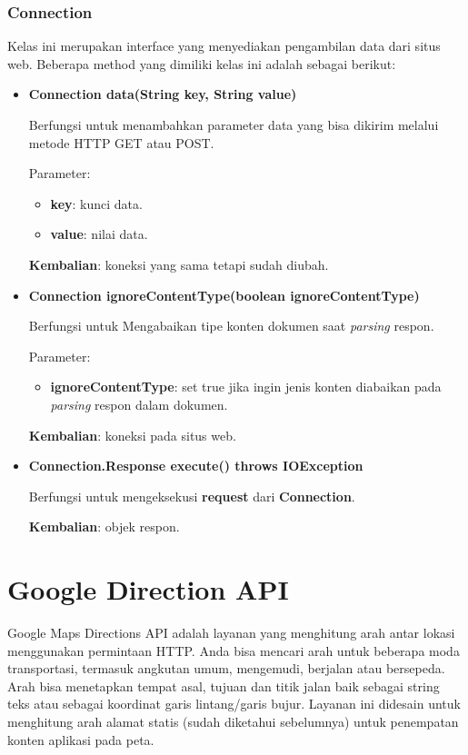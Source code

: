 \subsubsection{Connection}
\label{subsubsec:connection}

Kelas ini merupakan interface yang menyediakan pengambilan data dari situs web. Beberapa method yang dimiliki kelas ini adalah sebagai berikut:
\begin{itemize}
	\item \textbf{Connection data(String key, String value)}
	
	Berfungsi untuk menambahkan parameter data yang bisa dikirim melalui metode HTTP GET atau POST.
	
	Parameter:
	\begin{itemize}
		\item \textbf{key}: kunci data.
		\item \textbf{value}: nilai data.
	\end{itemize}
	\textbf{Kembalian}: koneksi yang sama tetapi sudah diubah.
	
	\item \textbf{Connection ignoreContentType(boolean ignoreContentType)}
	
	Berfungsi untuk Mengabaikan tipe konten dokumen saat \textit{parsing} respon.
	
	Parameter:
	\begin{itemize}
		\item \textbf{ignoreContentType}: set true jika ingin jenis konten diabaikan pada \textit{parsing} respon dalam dokumen.
	\end{itemize}
	\textbf{Kembalian}: koneksi pada situs web.
	
	\item \textbf{Connection.Response execute() throws IOException}
	
	Berfungsi untuk mengeksekusi \textbf{request} dari \textbf{Connection}.
	
	\textbf{Kembalian}: objek respon.
\end{itemize}

\section{Google Direction API}
\label{subsec:googledirapi}

Google Maps Directions API adalah layanan yang menghitung arah antar lokasi menggunakan permintaan HTTP. Anda bisa mencari arah untuk beberapa moda transportasi, termasuk angkutan umum, mengemudi, berjalan atau bersepeda. Arah bisa menetapkan tempat asal, tujuan dan titik jalan baik sebagai string teks atau sebagai koordinat garis lintang/garis bujur. Layanan ini didesain untuk menghitung arah alamat statis (sudah diketahui sebelumnya) untuk penempatan konten aplikasi pada peta.

